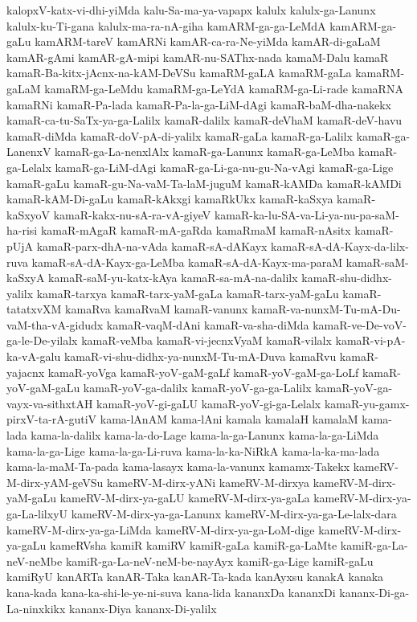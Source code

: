 {kalopxV-katx-vi-dhi-yiMda
kalu-Sa-ma-ya-vapapx
kalulx
kalulx-ga-Lanunx
kalulx-ku-Ti-gana
kalulx-ma-ra-nA-giha
kamARM-ga-ga-LeMdA
kamARM-ga-gaLu
kamARM-tareV
kamARNi
kamAR-ca-ra-Ne-yiMda
kamAR-di-gaLaM
kamAR-gAmi
kamAR-gA-mipi
kamAR-nu-SAThx-nada
kamaM-Dalu
kamaR
kamaR-Ba-kitx-jAcnx-na-kAM-DeVSu
kamaRM-gaLA
kamaRM-gaLa
kamaRM-gaLaM
kamaRM-ga-LeMdu
kamaRM-ga-LeYdA
kamaRM-ga-Li-rade
kamaRNA
kamaRNi
kamaR-Pa-lada
kamaR-Pa-la-ga-LiM-dAgi
kamaR-baM-dha-nakekx
kamaR-ca-tu-SaTx-ya-ga-Lalilx
kamaR-dalilx
kamaR-deVhaM
kamaR-deV-havu
kamaR-diMda
kamaR-doV-pA-di-yalilx
kamaR-gaLa
kamaR-ga-Lalilx
kamaR-ga-LanenxV
kamaR-ga-La-nenxlAlx
kamaR-ga-Lanunx
kamaR-ga-LeMba
kamaR-ga-Lelalx
kamaR-ga-LiM-dAgi
kamaR-ga-Li-ga-nu-gu-Na-vAgi
kamaR-ga-Lige
kamaR-gaLu
kamaR-gu-Na-vaM-Ta-laM-juguM
kamaR-kAMDa
kamaR-kAMDi
kamaR-kAM-Di-gaLu
kamaR-kAkxgi
kamaRkUkx
kamaR-kaSxya
kamaR-kaSxyoV
kamaR-kakx-nu-sA-ra-vA-giyeV
kamaR-ka-lu-SA-va-Li-ya-nu-pa-saM-ha-risi
kamaR-mAgaR
kamaR-mA-gaRda
kamaRmaM
kamaR-nAsitx
kamaR-pUjA
kamaR-parx-dhA-na-vAda
kamaR-sA-dAKayx
kamaR-sA-dA-Kayx-da-lilx-ruva
kamaR-sA-dA-Kayx-ga-LeMba
kamaR-sA-dA-Kayx-ma-paraM
kamaR-saM-kaSxyA
kamaR-saM-yu-katx-kAya
kamaR-sa-mA-na-dalilx
kamaR-shu-didhx-yalilx
kamaR-tarxya
kamaR-tarx-yaM-gaLa
kamaR-tarx-yaM-gaLu
kamaR-tatatxvXM
kamaRva
kamaRvaM
kamaR-vanunx
kamaR-va-nunxM-Tu-mA-Du-vaM-tha-vA-gidudx
kamaR-vaqM-dAni
kamaR-va-sha-diMda
kamaR-ve-De-voV-ga-le-De-yilalx
kamaR-veMba
kamaR-vi-jecnxVyaM
kamaR-vilalx
kamaR-vi-pA-ka-vA-galu
kamaR-vi-shu-didhx-ya-nunxM-Tu-mA-Duva
kamaRvu
kamaR-yajacnx
kamaR-yoVga
kamaR-yoV-gaM-gaLf
kamaR-yoV-gaM-ga-LoLf
kamaR-yoV-gaM-gaLu
kamaR-yoV-ga-dalilx
kamaR-yoV-ga-ga-Lalilx
kamaR-yoV-ga-vayx-va-sithxtAH
kamaR-yoV-gi-gaLU
kamaR-yoV-gi-ga-Lelalx
kamaR-yu-gamx-pirxV-ta-rA-gutiV
kama-lAnAM
kama-lAni
kamala
kamalaH
kamalaM
kama-lada
kama-la-dalilx
kama-la-do-Lage
kama-la-ga-Lanunx
kama-la-ga-LiMda
kama-la-ga-Lige
kama-la-ga-Li-ruva
kama-la-ka-NiRkA
kama-la-ka-ma-lada
kama-la-maM-Ta-pada
kama-lasayx
kama-la-vanunx
kamamx-Takekx
kameRV-M-dirx-yAM-geVSu
kameRV-M-dirx-yANi
kameRV-M-dirxya
kameRV-M-dirx-yaM-gaLu
kameRV-M-dirx-ya-gaLU
kameRV-M-dirx-ya-gaLa
kameRV-M-dirx-ya-ga-La-lilxyU
kameRV-M-dirx-ya-ga-Lanunx
kameRV-M-dirx-ya-ga-Le-lalx-dara
kameRV-M-dirx-ya-ga-LiMda
kameRV-M-dirx-ya-ga-LoM-dige
kameRV-M-dirx-ya-gaLu
kameRVsha
kamiR
kamiRV
kamiR-gaLa
kamiR-ga-LaMte
kamiR-ga-La-neV-neMbe
kamiR-ga-La-neV-neM-be-nayAyx
kamiR-ga-Lige
kamiR-gaLu
kamiRyU
kanARTa
kanAR-Taka
kanAR-Ta-kada
kanAyxsu
kanakA
kanaka
kana-kada
kana-ka-shi-le-ye-ni-suva
kana-lida
kananxDa
kananxDi
kananx-Di-ga-La-ninxkikx
kananx-Diya
kananx-Di-yalilx
}

